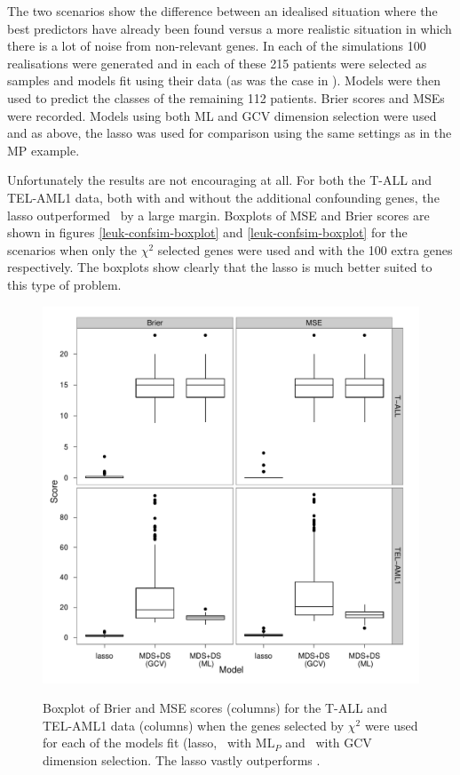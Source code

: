 The two scenarios show the difference between an idealised situation where the best predictors have already been found versus a more realistic situation in which there is a lot of noise from non-relevant genes. In each of the simulations 100 realisations were generated and in each of these 215 patients were selected as samples and models fit using their data (as was the case in \cite{yeoh2002}). Models were then used to predict the classes of the remaining 112 patients. Brier scores and MSEs were recorded. Models using both ML and GCV dimension selection were used and as above, the lasso was used for comparison using the same settings as in the MP example. 

Unfortunately the results are not encouraging at all. For both the T-ALL and TEL-AML1 data, both with and without the additional confounding genes, the lasso outperformed \mdsds\ by a large margin. Boxplots of MSE and Brier scores are shown in figures \ref{leuk-confsim-boxplot} and \ref{leuk-confsim-boxplot} for the scenarios when only the $\chi^2$ selected genes were used and with the 100 extra genes respectively. The boxplots show clearly that the lasso is much better suited to this type of problem.

\begin{figure}
\centering
\includegraphics[width=6in]{gds/figs/sim-msebrier.pdf} \\
\caption{Boxplot of Brier and MSE scores (columns) for the T-ALL and TEL-AML1 data (columns) when the genes selected by $\chi^2$ were used for each of the models fit (lasso, \mdsds\ with $\text{ML}_P$ and \mdsds\ with GCV dimension selection. The lasso vastly outperforms \mdsds.}
\label{leuk-sim-boxplot}
\end{figure}

